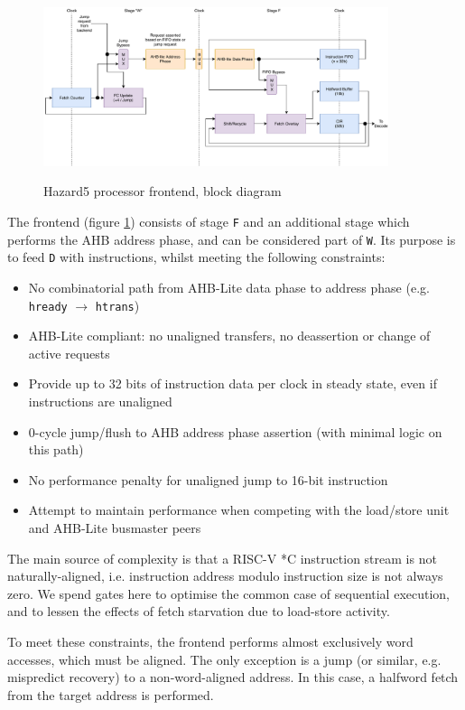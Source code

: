 \documentclass[notitlepage]{article}
\begin{document}
\begin{figure}[!htb]
\centering
\caption{Hazard5 processor frontend, block diagram}
\includegraphics[width=0.9\textwidth]{diagrams/cpu_frontend.pdf}
\label{diagram:frontend}
\end{figure}

The frontend (figure \ref{diagram:frontend}) consists of stage \texttt{F} and an additional stage which performs the AHB address phase, and can be considered part of \texttt{W}. Its purpose is to feed \texttt{D} with instructions, whilst meeting the following constraints:

\begin{itemize}
	\item No combinatorial path from AHB-Lite data phase to address phase (e.g. \texttt{hready} $\to$ \texttt{htrans})
	\item AHB-Lite compliant: no unaligned transfers, no deassertion or change of active requests
	\item Provide up to 32 bits of instruction data per clock in steady state, even if instructions are unaligned
	\item 0-cycle jump/flush to AHB address phase assertion (with minimal logic on this path)
	\item No performance penalty for unaligned jump to 16-bit instruction
	\item Attempt to maintain performance when competing with the load/store unit and AHB-Lite busmaster peers
\end{itemize}

The main source of complexity is that a RISC-V *C instruction stream is not naturally-aligned, i.e. instruction address modulo instruction size is not always zero. We spend gates here to optimise the common case of sequential execution, and to lessen the effects of fetch starvation due to load-store activity.

To meet these constraints, the frontend performs almost exclusively word accesses, which must be aligned. The only exception is a jump (or similar, e.g. mispredict recovery) to a non-word-aligned address. In this case, a halfword fetch from the target address is performed.
\end{document}
